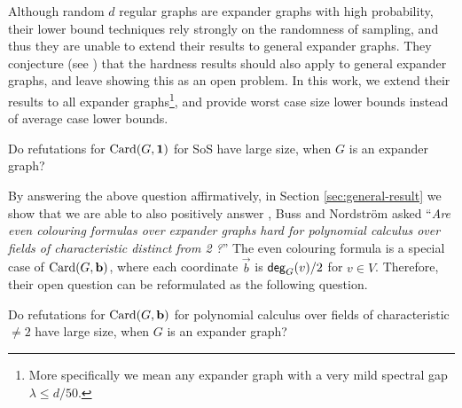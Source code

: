 \documentclass[11pt]{article}
\begin{document}
Although random $d$ regular graphs are expander graphs with high probability, their lower bound techniques rely strongly on the randomness of sampling, and thus they are unable to extend their results to general expander graphs.
They conjecture (see \citep[Section 6]{Austrin_2022}) that the hardness results should also apply to general expander graphs, and leave showing this as an open problem. In this work, we extend their results to all expander graphs\footnote{More specifically we mean any expander graph with a very mild spectral gap $\lambda \leq d/50$.}, and provide worst case size lower bounds instead of average case lower bounds.

\begin{problem}

Do refutations for $\text{Card}(G, \mathbf{1})$ for SoS have large size, when $G$ is an expander graph?

\end{problem}

By answering the above question affirmatively, in Section \ref{sec:general-result} we show that we are able to also positively answer \citep[Open Problem 7.7]{buss2021proof}, Buss and Nordstr{\"o}m asked ``\textit{Are even colouring formulas over expander graphs hard for
polynomial calculus over fields of characteristic distinct from 2 ?}''
The even colouring formula is a special case of $\text{Card}(G, \mathbf{b})$, where each coordinate  $\vec{b}$ is $\mathsf{deg}_{G}(v)/2$ for $v \in V$.
Therefore, their open question can be reformulated as the following question.

\begin{problem}

Do refutations for $\text{Card}(G, \mathbf{b})$ for
polynomial calculus over fields of characteristic $\neq 2$ have large size, when $G$ is an expander graph? 
\end{problem}
\end{document}
